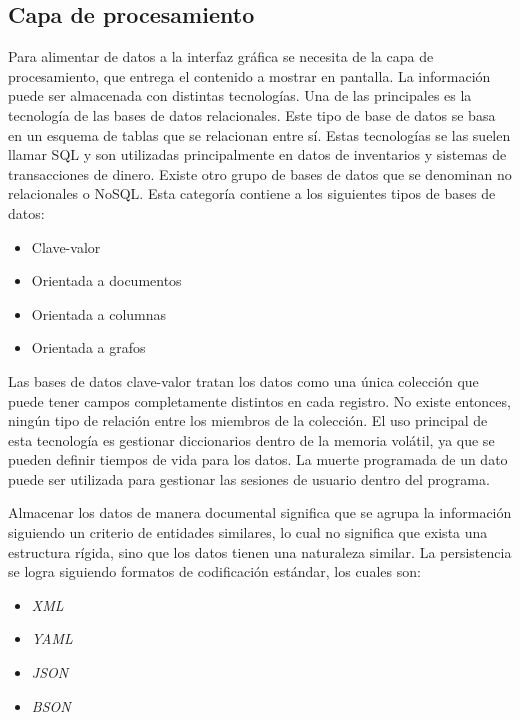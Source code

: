 \newpage

\subsection{Capa de procesamiento}
Para alimentar de datos a la interfaz gráfica se necesita de la capa de procesamiento, que entrega el contenido a mostrar en pantalla. La información puede ser almacenada con distintas tecnologías.
Una de las principales es la tecnología de las bases de datos relacionales.
Este tipo de base de datos se basa en un esquema de tablas que se relacionan entre sí.
Estas tecnologías se las suelen llamar SQL y son utilizadas principalmente en datos de inventarios y sistemas de transacciones de dinero.
Existe otro grupo de bases de datos que se denominan no relacionales o NoSQL.
Esta categoría contiene a los siguientes tipos de bases de datos:

\begin{itemize}
	\item Clave-valor
	\item Orientada a documentos
	\item Orientada a columnas
	\item Orientada a grafos
\end{itemize}

Las bases de datos clave-valor tratan los datos como una única colección que puede tener campos completamente distintos en cada registro.
No existe entonces, ningún tipo de relación entre los miembros de la colección. El uso principal de esta tecnología es gestionar diccionarios dentro de la memoria volátil, ya que se pueden definir tiempos de vida para los datos. La muerte programada de un dato puede ser utilizada para gestionar las sesiones de usuario dentro del programa.

Almacenar los datos de manera documental significa que se agrupa la información siguiendo un criterio de entidades similares, lo cual no significa que exista una estructura rígida, sino que los datos tienen una naturaleza similar.
La persistencia se logra siguiendo formatos de codificación estándar, los cuales son:

\begin{itemize}
	\item \emph{XML}
	\item \emph{YAML}
	\item \emph{JSON}
	\item \emph{BSON}
\end{itemize}

